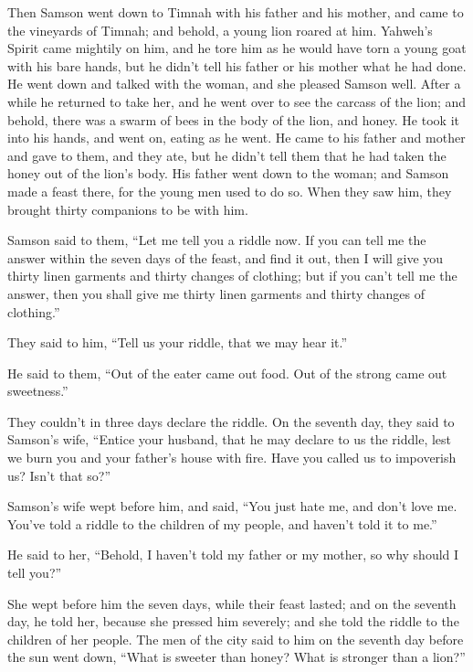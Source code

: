  Then Samson went down to Timnah with his father and his
mother, and came to the vineyards of Timnah; and behold, a young lion
roared at him.  Yahweh's Spirit came mightily on him, and he
tore him as he would have torn a young goat with his bare hands, but he
didn't tell his father or his mother what he had done.  He
went down and talked with the woman, and she pleased Samson well.
 After a while he returned to take her, and he went over to
see the carcass of the lion; and behold, there was a swarm of bees in
the body of the lion, and honey.  He took it into his hands,
and went on, eating as he went. He came to his father and mother and
gave to them, and they ate, but he didn't tell them that he had taken
the honey out of the lion's body.  His father went down to
the woman; and Samson made a feast there, for the young men used to do
so.  When they saw him, they brought thirty companions to
be with him.

 Samson said to them, ``Let me tell you a riddle now. If
you can tell me the answer within the seven days of the feast, and find
it out, then I will give you thirty linen garments and thirty changes of
clothing;  but if you can't tell me the answer, then you
shall give me thirty linen garments and thirty changes of clothing.''

They said to him, ``Tell us your riddle, that we may hear it.''

 He said to them, ``Out of the eater came out food. Out of
the strong came out sweetness.''

They couldn't in three days declare the riddle.  On the
seventh day, they said to Samson's wife, ``Entice your husband, that he
may declare to us the riddle, lest we burn you and your father's house
with fire. Have you called us to impoverish us? Isn't that so?''

 Samson's wife wept before him, and said, ``You just hate
me, and don't love me. You've told a riddle to the children of my
people, and haven't told it to me.''

He said to her, ``Behold, I haven't told my father or my mother, so why
should I tell you?''

 She wept before him the seven days, while their feast
lasted; and on the seventh day, he told her, because she pressed him
severely; and she told the riddle to the children of her people.
 The men of the city said to him on the seventh day before
the sun went down, ``What is sweeter than honey? What is stronger than a
lion?''

